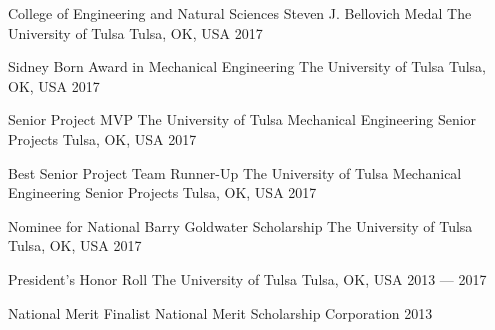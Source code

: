 \begin{cvhonors}

  \cvhonor
    {College of Engineering and Natural Sciences Steven J. Bellovich Medal} %
    {The University of Tulsa} %
    {Tulsa, OK, USA} %
    {2017} %

  \cvhonor
    {Sidney Born Award in Mechanical Engineering} %
    {The University of Tulsa} %
    {Tulsa, OK, USA} %
    {2017} %

  \cvhonor
    {Senior Project MVP} %
    {The University of Tulsa Mechanical Engineering Senior Projects} %
    {Tulsa, OK, USA} %
    {2017} %

  \cvhonor
    {Best Senior Project Team Runner-Up} %
    {The University of Tulsa Mechanical Engineering Senior Projects} %
    {Tulsa, OK, USA} %
    {2017} %

  \cvhonor
    {Nominee for National Barry Goldwater Scholarship} %
    {The University of Tulsa} %
    {Tulsa, OK, USA} %
    {2017} %
    
\cvhonor
	{President's Honor Roll} %
	{The University of Tulsa} %
	{Tulsa, OK, USA} %
	{2013 --- 2017} %
 
\cvhonor
	{National Merit Finalist} %
	{National Merit Scholarship Corporation} %
	{} %
	{2013} %

\end{cvhonors}
